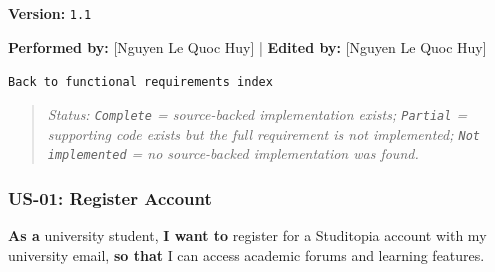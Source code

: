\documentclass[12pt]{article}
\begin{document}
\textbf{Version:} \texttt{1.1}
\par\medskip

\textbf{Performed by:} [Nguyen Le Quoc Huy] | \textbf{Edited by:} [Nguyen Le Quoc Huy]
\par\medskip

\texttt{Back to functional requirements index}
\par\medskip

\begin{quote}
\textit{Status: \texttt{Complete} = source-backed implementation exists; \texttt{Partial} = supporting code exists but the full requirement is not implemented; \texttt{Not implemented} = no source-backed implementation was found.}
\end{quote}
\par\medskip

\hypertarget{sec:us-01-register-account}{}
\subsubsection*{US-01: Register Account}
\par\medskip

\textbf{As a} university student, \textbf{I want to} register for a Studitopia account with my university email, \textbf{so that} I can access academic forums and learning features.
\par\medskip
\end{document}
